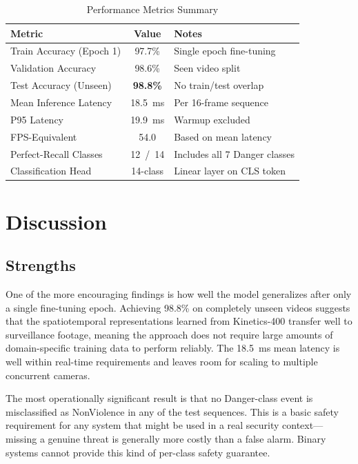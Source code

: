 \documentclass[conference]{IEEEtran}
\begin{document}
\begin{table}[htbp]
\caption{Performance Metrics Summary}
\label{tab:summary}
\centering
\renewcommand{\arraystretch}{1.2}
\begin{tabular}{|l|c|l|}
\hline
\textbf{Metric} & \textbf{Value} & \textbf{Notes} \\
\hline
Train Accuracy (Epoch 1) & 97.7\%          & Single epoch fine-tuning \\
Validation Accuracy      & 98.6\%          & Seen video split \\
Test Accuracy (Unseen)   & \textbf{98.8\%} & No train/test overlap \\
Mean Inference Latency   & 18.5~ms         & Per 16-frame sequence \\
P95 Latency              & 19.9~ms         & Warmup excluded \\
FPS-Equivalent           & 54.0            & Based on mean latency \\
Perfect-Recall Classes   & 12~/~14         & Includes all 7 Danger classes \\
Classification Head      & 14-class        & Linear layer on CLS token \\
\hline
\end{tabular}
\end{table}

\section{Discussion}

\subsection{Strengths}

One of the more encouraging findings is how well the model generalizes
after only a single fine-tuning epoch. Achieving 98.8\% on completely
unseen videos suggests that the spatiotemporal representations learned
from Kinetics-400 transfer well to surveillance footage, meaning the
approach does not require large amounts of domain-specific training data
to perform reliably. The 18.5~ms mean latency is well within real-time
requirements and leaves room for scaling to multiple concurrent cameras.

The most operationally significant result is that no Danger-class event
is misclassified as NonViolence in any of the test sequences. This is
a basic safety requirement for any system that might be used in a real
security context---missing a genuine threat is generally more costly
than a false alarm. Binary systems cannot provide this kind of
per-class safety guarantee.
\end{document}
